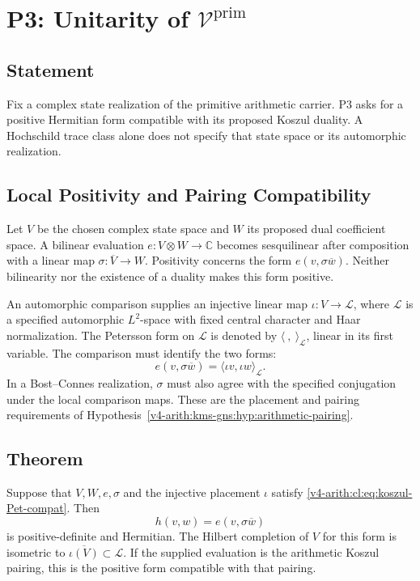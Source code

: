 \section{P3: Unitarity of \(\mathcal{V}^{\mathrm{prim}}\)}
\label{v4-arith:cl:P3-resolution}

\subsection{Statement}

Fix a complex state realization of the primitive arithmetic carrier.
P3 asks for a positive Hermitian form compatible with its proposed
Koszul duality. A Hochschild trace class alone does
not specify that state space or its automorphic realization.

\subsection{Local Positivity and Pairing Compatibility}

Let \(V\) be the chosen complex state space and \(W\) its proposed
dual coefficient space. A bilinear evaluation
\(e\colon V\otimes W\to\mathbb C\) becomes sesquilinear after
composition with a linear map \(\sigma\colon\overline V\to W\).
Positivity concerns the form \(e(v,\sigma\overline w)\). Neither
bilinearity nor the existence of a duality makes this form positive.

An automorphic comparison supplies an injective linear map
\(\iota\colon V\to\mathscr L\), where \(\mathscr L\) is a specified
automorphic \(L^2\)-space with fixed central character and Haar
normalization. The Petersson form on \(\mathscr L\) is denoted by
\(\langle\ ,\ \rangle_{\mathscr L}\), linear in its first variable.
The comparison must identify the two forms:
\begin{equation}
\label{v4-arith:cl:eq:koszul-Pet-compat}
e(v,\sigma\overline w)
=\langle\iota v,\iota w\rangle_{\mathscr L}.
\end{equation}
In a Bost--Connes realization, \(\sigma\) must also agree with the
specified conjugation under the local comparison maps. These are
the placement and pairing requirements of
Hypothesis~\ref{v4-arith:kms-gns:hyp:arithmetic-pairing}.

\subsection{Theorem}

\begin{theorem}
\label{v4-arith:thm:P3-resolution}
Suppose that \(V,W,e,\sigma\) and the injective placement \(\iota\)
satisfy \eqref{v4-arith:cl:eq:koszul-Pet-compat}. Then
\begin{equation}
h(v,w)=e(v,\sigma\overline w)
\end{equation}
is positive-definite and Hermitian. The Hilbert completion of \(V\)
for this form is isometric to \(\overline{\iota(V)}\subset\mathscr L\).
If the supplied evaluation is the arithmetic Koszul pairing, this
is the positive form compatible with that pairing.
\end{theorem}

